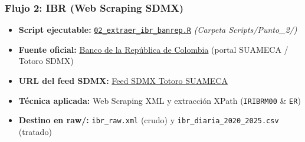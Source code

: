 \documentclass[
  10pt,
  letterpaper,
  DIV=11,
  numbers=noendperiod]{scrartcl}
\providecommand{\tightlist}{%
  \setlength{\itemsep}{0pt}\setlength{\parskip}{0pt}}
\begin{document}
\subsubsection{Flujo 2: IBR (Web Scraping SDMX)}

\begin{itemize}
\tightlist
\item
  \textbf{Script ejecutable:}
  \href{https://github.com/MPalma21/Talleres_de_R/blob/main/Entregable_Talleres/Taller_3/Scripts/Punto_2/02_extraer_ibr_banrep.R}{\texttt{02\_extraer\_ibr\_banrep.R}}
  \emph{(Carpeta Scripts/Punto\_2/)}
\item
  \textbf{Fuente oficial:}
  \href{https://www.banrep.gov.co/es/estadisticas/indicador-bancario-referencia-ibr}{Banco
  de la República de Colombia} (portal SUAMECA / Totoro SDMX)
\item
  \textbf{URL del feed SDMX:}
  \href{https://totoro.banrep.gov.co/nsi-jax-ws/rest/data/ESTAT,DF_IBR_DAILY_HIST,1.0/all/ALL/?startPeriod=2020&dimensionAtObservation=TIME_PERIOD&detail=full}{Feed
  SDMX Totoro SUAMECA}
\item
  \textbf{Técnica aplicada:} Web Scraping XML y extracción XPath
  (\texttt{IRIBRM00} \& \texttt{ER})
\item
  \textbf{Destino en raw/:} \texttt{ibr\_raw.xml} (crudo) y
  \texttt{ibr\_diaria\_2020\_2025.csv} (tratado)
\end{itemize}
\end{document}
